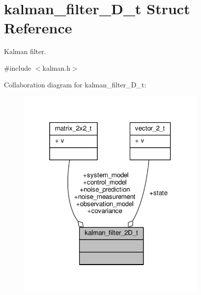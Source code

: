 \hypertarget{structkalman__filter__2D__t}{\section{kalman\+\_\+filter\+\_\+D\+\_\+t Struct Reference}
\label{structkalman__filter__2D__t}
}


Kalman filter.  




{\ttfamily \#include $<$kalman.\+h$>$}



Collaboration diagram for kalman\+\_\+filter\+\_\+D\+\_\+t\+:
\nopagebreak
\begin{figure}[H]
\begin{center}
\leavevmode
\includegraphics[width=265pt]{structkalman__filter__2D__t__coll__graph}
\end{center}
\end{figure}
